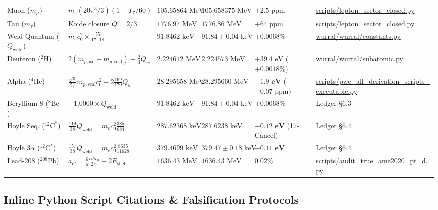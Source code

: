 \documentclass[11pt,a4paper]{article}
\begin{document}
\begin{table}[!htbp]
\begin{tabularx}{\textwidth}{L{2.25cm} L{3.32cm} L{2.28cm} L{2.38cm} Y L{2.5cm}}
Muon ($m_\mu$) & $m_e(20\pi^3/3)(1 + T_7/60)$ & $105.65864\text{ MeV}$ & $105.658375\text{ MeV}$ & $+2.5\text{ ppm}$ & \url{scripts/lepton_sector_closed.py} \\
Tau ($m_\tau$) & Koide closure $Q = 2/3$ & $1776.97\text{ MeV}$ & $1776.86\text{ MeV}$ & $+64\text{ ppm}$ & \url{scripts/lepton_sector_closed.py} \\
Weld Quantum ($Q_{\text{weld}}$) & $m_e c_0^2 \times \frac{55}{17 \cdot 18}$ & $91.8462\text{ keV}$ & $91.84 \pm 0.04\text{ keV}$ & $+0.0068\%$ & \url{wurral/wurral/constants.py} \\
Deuteron ($^2\text{H}$) & $2(m_{p,\text{iso}} - m_{p,\text{seal}}) + \frac{2}{3}Q_w$ & $2.224612\text{ MeV}$ & $2.224573\text{ MeV}$ & $+39.4\text{ eV}$ ($+0.0018\%$) & \url{wurral/wurral/subatomic.py} \\
Alpha ($^4\text{He}$) & $\frac{\sqrt{3}}{57}m_{p,\text{seal}}c_0^2 - 2\frac{169}{170}Q_w$ & $28.295658\text{ MeV}$ & $28.295660\text{ MeV}$ & $\mathbf{-1.9\text{ eV}}$ ($-0.07\text{ ppm}$) & \url{scripts/pwc_all_derivation_scripts_executable.py} \\
Beryllium-8 ($^8\text{Be}$) & $+1.0000 \times Q_{\text{weld}}$ & $91.8462\text{ keV}$ & $91.84 \pm 0.04\text{ keV}$ & $+0.0068\%$ & Ledger \S6.3 \\
Hoyle Seq. ($^{12}\text{C}^*$) & $\frac{119}{38}Q_{\text{weld}} = m_e c_0^2 \frac{385}{684}$ & $287.62368\text{ keV}$ & $287.6238\text{ keV}$ & $\mathbf{-0.12\text{ eV}}$ (17-Cancel) & Ledger \S6.4 \\
Hoyle $3\alpha$ ($^{12}\text{C}^*$) & $\frac{157}{38}Q_{\text{weld}} = m_e c_0^2 \frac{8635}{11628}$ & $379.4699\text{ keV}$ & $379.47 \pm 0.18\text{ keV}$ & $\mathbf{-0.11\text{ eV}}$ & Ledger \S6.4 \\
Lead-208 ($^{208}\text{Pb}$) & $a_C = \frac{6}{5}\frac{\alpha\hbar c_0}{2r_0} + 2E_{\text{shell}}$ & $1636.43\text{ MeV}$ & $1636.43\text{ MeV}$ & $0.02\%$ & \url{scripts/audit_true_ame2020_pt_d.py} \\
\bottomrule
\end{tabularx}
\end{table}

\subsection{Inline Python Script Citations \& Falsification Protocols}
\label{subsec:williamson_scripts}
\end{document}
